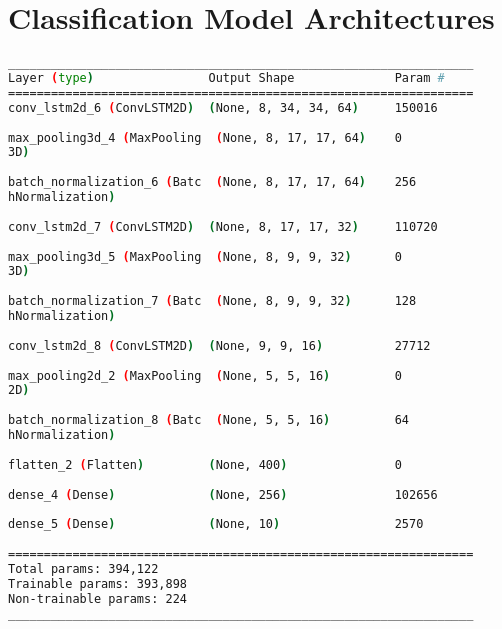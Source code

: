 \chapter{Classification Model Architectures}

\begin{lstlisting}[language=Bash,caption={Overview of layers in Convolutional LTSM network.},label={lst:conv_lstm_layers},numbers=none,float=htb]
_________________________________________________________________
Layer (type)                Output Shape              Param #   
=================================================================
conv_lstm2d_6 (ConvLSTM2D)  (None, 8, 34, 34, 64)     150016    
                                                                
max_pooling3d_4 (MaxPooling  (None, 8, 17, 17, 64)    0         
3D)                                                             
                                                                
batch_normalization_6 (Batc  (None, 8, 17, 17, 64)    256       
hNormalization)                                                 
                                                                
conv_lstm2d_7 (ConvLSTM2D)  (None, 8, 17, 17, 32)     110720    
                                                                
max_pooling3d_5 (MaxPooling  (None, 8, 9, 9, 32)      0         
3D)                                                             
                                                                
batch_normalization_7 (Batc  (None, 8, 9, 9, 32)      128       
hNormalization)                                                 
                                                                
conv_lstm2d_8 (ConvLSTM2D)  (None, 9, 9, 16)          27712     
                                                                
max_pooling2d_2 (MaxPooling  (None, 5, 5, 16)         0         
2D)                                                             
                                                                
batch_normalization_8 (Batc  (None, 5, 5, 16)         64        
hNormalization)                                                 
                                                                
flatten_2 (Flatten)         (None, 400)               0         
                                                                
dense_4 (Dense)             (None, 256)               102656    
                                                                
dense_5 (Dense)             (None, 10)                2570      
                                                                
=================================================================
Total params: 394,122
Trainable params: 393,898
Non-trainable params: 224
_________________________________________________________________
\end{lstlisting}


